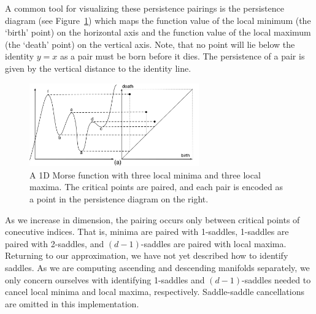 A common tool for visualizing these persistence pairings is the persistence diagram (see Figure~\ref{fig:persistenceDiagram}) which maps the function value of the local minimum (the `birth' point) on the horizontal axis and the function value of the local maximum (the `death' point) on the vertical axis.
%
Note, that no point will lie below the identity $y=x$ as a pair must be born before it dies.
%
The persistence of a pair is given by the vertical distance to the identity line.

\begin{figure}[!ht]
  \centering
  \includegraphics[width=0.65\textwidth]{figs/chap4/persistence-diagram}
  \caption[A 1D Function and its Persistence Diagram]{A 1D Morse function with three local minima and three local maxima.
  The critical points are paired, and each pair is encoded as a point in the persistence diagram on the right.}
  \label{fig:persistenceDiagram}
\end{figure}

As we increase in dimension, the pairing occurs only between critical points of conecutive indices.
%
That is, minima are paired with 1-saddles, 1-saddles are paired with 2-saddles, and $(d-1)$-saddles are paired with local maxima.
%
Returning to our approximation, we have not yet described how to identify saddles.
%
As we are computing ascending and descending manifolds separately, we only concern ourselves with identifying 1-saddles and $(d-1)$-saddles needed to cancel local minima and local maxima, respectively.
%
Saddle-saddle cancellations are omitted in this implementation.

